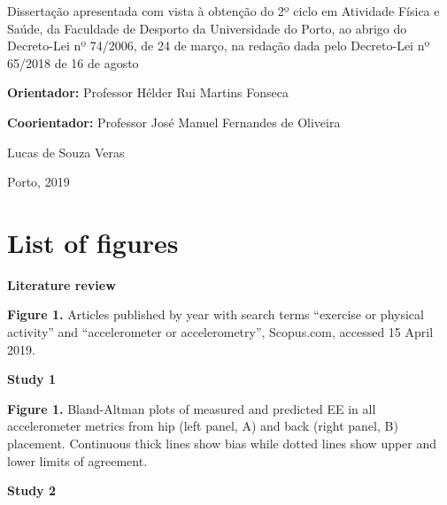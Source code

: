 \documentclass[12pt]{article}
\def\blankpage{%
      \clearpage%
      \thispagestyle{empty}%
      \addtocounter{page}{+0}%
      \null%
      \clearpage}
\begin{document}
\begingroup
\setlength{\leftskip}{3.75cm} \noindent Dissertação apresentada com vista à obtenção do 2º ciclo em Atividade Física e Saúde, da Faculdade de Desporto da Universidade do Porto, ao abrigo do Decreto-Lei nº 74/2006, de 24 de março, na redação dada pelo Decreto-Lei nº 65/2018 de 16 de agosto
\par
\endgroup

\vspace{\fill}

\noindent \textbf{Orientador:} Professor Hélder Rui Martins Fonseca

\noindent \textbf{Coorientador:} Professor José Manuel Fernandes de Oliveira

\medskip

\begin{center}
Lucas de Souza Veras

Porto, 2019
\end{center}
\thispagestyle{empty}
\blankpage

\renewcommand{\contentsname}{\centerline{\bfseries\Large Table of Contents \vspace{1em}}}
\tableofcontents
\blankpage

\section*{\hfil List of figures \hfil}
\vspace{0.5em}

\noindent \textbf{Literature review}

\vspace{0.5em}

\noindent \textbf{Figure 1.} Articles published by year with search terms ``exercise or physical activity'' and ``accelerometer or accelerometry'', Scopus.com, accessed 15 April 2019. 
\vspace{2em}

\noindent \textbf{Study 1}
\vspace{0.5em}

\noindent \textbf{Figure 1.} Bland-Altman plots of measured and predicted EE in all accelerometer metrics from hip (left panel, A) and back (right panel, B) placement. Continuous thick lines show bias while dotted lines show upper and lower limits of agreement. 

\noindent {}
\vspace{2em}

\noindent \textbf{Study 2}
\vspace{0.5em}
\end{document}
